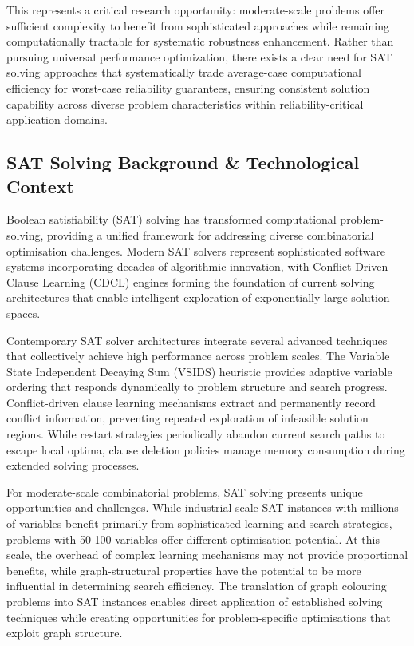 This represents a critical research opportunity: moderate-scale problems offer sufficient complexity to benefit from sophisticated approaches while remaining computationally tractable for systematic robustness enhancement. Rather than pursuing universal performance optimization, there exists a clear need for SAT solving approaches that systematically trade average-case computational efficiency for worst-case reliability guarantees, ensuring consistent solution capability across diverse problem characteristics within reliability-critical application domains.


\subsection{SAT Solving Background \& Technological Context}

Boolean satisfiability (SAT) solving has transformed computational problem-solving, providing a unified framework for addressing diverse combinatorial optimisation challenges. Modern SAT solvers represent sophisticated software systems incorporating decades of algorithmic innovation, with Conflict-Driven Clause Learning (CDCL) engines forming the foundation of current solving architectures that enable intelligent exploration of exponentially large solution spaces.

Contemporary SAT solver architectures integrate several advanced techniques that collectively achieve high performance across problem scales. The Variable State Independent Decaying Sum (VSIDS) heuristic provides adaptive variable ordering that responds dynamically to problem structure and search progress. Conflict-driven clause learning mechanisms extract and permanently record conflict information, preventing repeated exploration of infeasible solution regions. While restart strategies periodically abandon current search paths to escape local optima, clause deletion policies manage memory consumption during extended solving processes.

For moderate-scale combinatorial problems, SAT solving presents unique opportunities and challenges. While industrial-scale SAT instances with millions of variables benefit primarily from sophisticated learning and search strategies, problems with 50-100 variables offer different optimisation potential. At this scale, the overhead of complex learning mechanisms may not provide proportional benefits, while graph-structural properties have the potential to be more influential in determining search efficiency. The translation of graph colouring problems into SAT instances enables direct application of established solving techniques while creating opportunities for problem-specific optimisations that exploit graph structure.


